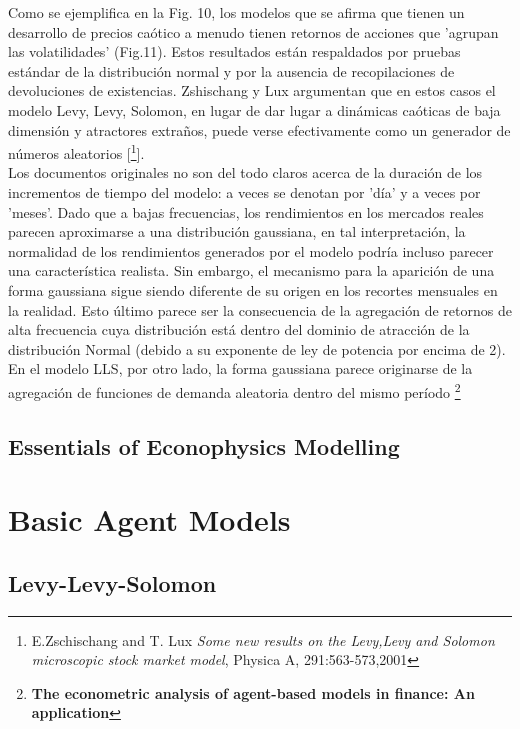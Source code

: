 \documentclass[12pt,a4paper]{article}
\begin{document}
\quad Como se ejemplifica en la Fig. 10, los modelos que se afirma que tienen un desarrollo de precios caótico a menudo tienen retornos de acciones que 'agrupan las volatilidades' (Fig.11). Estos resultados están respaldados por pruebas estándar de la distribución normal y por la ausencia de recopilaciones de devoluciones de existencias. Zshischang y Lux argumentan que en estos casos el modelo Levy, Levy, Solomon, en lugar de dar lugar a dinámicas caóticas de baja dimensión y atractores extraños, puede verse efectivamente como un generador de números aleatorios [\footnote{E.Zschischang and T. Lux \textit{Some new results on the Levy,Levy and Solomon microscopic stock market model}, Physica A, 291:563-573,2001}].\\
\quad Los documentos originales no son del todo claros acerca de la duración de los incrementos de tiempo del modelo: a veces se denotan por 'día' y a veces por 'meses'. Dado que a bajas frecuencias, los rendimientos en los mercados reales parecen aproximarse a una distribución gaussiana, en tal interpretación, la normalidad de los rendimientos generados por el modelo podría incluso parecer una característica realista. Sin embargo, el mecanismo para la aparición de una forma gaussiana sigue siendo diferente de su origen en los recortes mensuales en la realidad. Esto último parece ser la consecuencia de la agregación de retornos de alta frecuencia cuya distribución está dentro del dominio de atracción de la distribución Normal (debido a su exponente de ley de potencia por encima de 2). En el modelo LLS, por otro lado, la forma gaussiana parece originarse de la agregación de funciones de demanda aleatoria dentro del mismo período
\newpage
\footnote{\textbf{The econometric analysis of agent-based models in finance: An application}}
\newpage
\begin{center}
\section*{Essentials of Econophysics Modelling\citep{slanina2013}}
\end{center}
\section*{Basic Agent Models}
\subsection*{Levy-Levy-Solomon}
\end{document}
